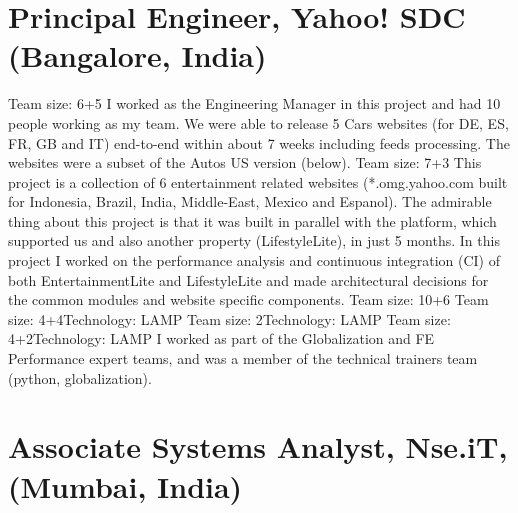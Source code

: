 \documentclass[11pt,a4paper,sans]{moderncv} %
\begin{document}
\section{Principal Engineer, Yahoo! SDC (Bangalore, India)}
         {Team size: 6+5}{}
         {I worked as the Engineering Manager in this project and had 10 people working as my team. We were able to release 5 Cars websites (for DE, ES, FR, GB and IT) end-to-end within about 7 weeks including feeds processing. The websites were a subset of the Autos US version (below).}
         {Team size: 7+3}{}
         {This project is a collection of 6 entertainment related websites (*.omg.yahoo.com built for Indonesia, Brazil, India, Middle-East, Mexico and Espanol). The admirable thing about this project is that it was built in parallel with the platform, which supported us and also another property (LifestyleLite), in just 5 months. In this project I worked on the performance analysis and continuous integration (CI) of both EntertainmentLite and LifestyleLite and made architectural decisions for the common modules and website specific components.} %
         {Team size: 10+6}{}
         {}
         {Team size: 4+4}{Technology: LAMP}{}
         {Team size: 2}{Technology: LAMP}{}
         {Team size: 4+2}{Technology: LAMP}{}
         {I worked as part of the Globalization and FE Performance expert teams, and was a member of the technical trainers team (python, globalization).}

\section{Associate Systems Analyst, Nse.iT, (Mumbai, India)}
\end{document}
